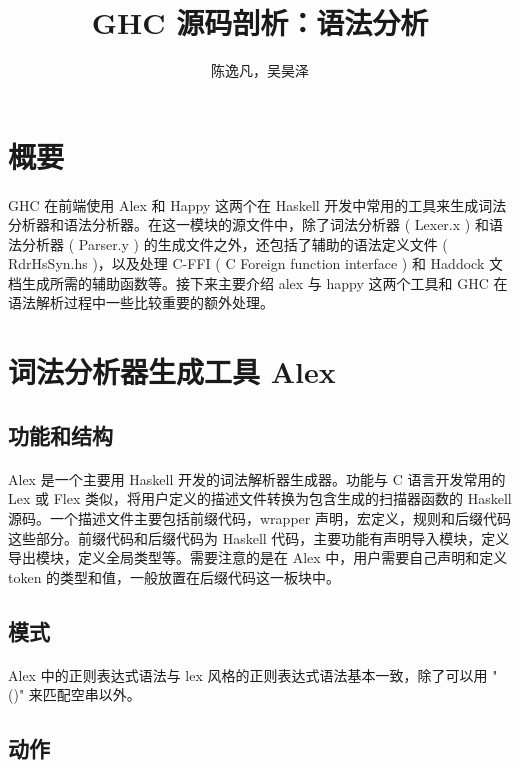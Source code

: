 \documentclass{article}
\author{陈逸凡，吴昊泽}
\title{GHC 源码剖析：语法分析}
\begin{document}
	\maketitle
	
	\section{概要}
	\paragraph{}
	GHC 在前端使用 Alex\cite{alex} 和 Happy\cite{happy} 这两个在 Haskell 开发中常用的工具来生成词法分析器和语法分析器。在这一模块的源文件\cite{ghcparser}中，除了词法分析器 ( Lexer.x ) 和语法分析器 ( Parser.y ) 的生成文件之外，还包括了辅助的语法定义文件 ( RdrHsSyn.hs )，以及处理 C-FFI ( C Foreign function interface ) 和 Haddock 文档生成所需的辅助函数等。接下来主要介绍 alex 与 happy 这两个工具和 GHC 在语法解析过程中一些比较重要的额外处理。
	\section{词法分析器生成工具 Alex}
	\subsection{功能和结构}
	\paragraph{}
	Alex\cite{alex} 是一个主要用 Haskell 开发的词法解析器生成器。功能与 C 语言开发常用的 Lex 或 Flex 类似，将用户定义的描述文件转换为包含生成的扫描器函数的 Haskell 源码。一个描述文件主要包括前缀代码，wrapper 声明，宏定义，规则和后缀代码这些部分。前缀代码和后缀代码为 Haskell 代码，主要功能有声明导入模块，定义导出模块，定义全局类型等。需要注意的是在 Alex 中，用户需要自己声明和定义 token 的类型和值，一般放置在后缀代码这一板块中。
	\subsection{模式}
	\paragraph{}
	Alex 中的正则表达式语法与 lex 风格的正则表达式语法基本一致，除了可以用 "()" 来匹配空串以外。
	\subsection{动作}
\end{document}
